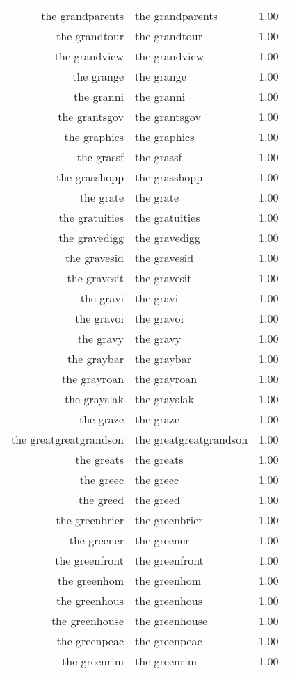\begin{table}[ht]
\begin{tabular}{rlr}
  the grandparents & the grandparents & 1.00 \\ 
  the grandtour & the grandtour & 1.00 \\ 
  the grandview & the grandview & 1.00 \\ 
  the grange & the grange & 1.00 \\ 
  the granni & the granni & 1.00 \\ 
  the grantsgov & the grantsgov & 1.00 \\ 
  the graphics & the graphics & 1.00 \\ 
  the grassf & the grassf & 1.00 \\ 
  the grasshopp & the grasshopp & 1.00 \\ 
  the grate & the grate & 1.00 \\ 
  the gratuities & the gratuities & 1.00 \\ 
  the gravedigg & the gravedigg & 1.00 \\ 
  the gravesid & the gravesid & 1.00 \\ 
  the gravesit & the gravesit & 1.00 \\ 
  the gravi & the gravi & 1.00 \\ 
  the gravoi & the gravoi & 1.00 \\ 
  the gravy & the gravy & 1.00 \\ 
  the graybar & the graybar & 1.00 \\ 
  the grayroan & the grayroan & 1.00 \\ 
  the grayslak & the grayslak & 1.00 \\ 
  the graze & the graze & 1.00 \\ 
  the greatgreatgrandson & the greatgreatgrandson & 1.00 \\ 
  the greats & the greats & 1.00 \\ 
  the greec & the greec & 1.00 \\ 
  the greed & the greed & 1.00 \\ 
  the greenbrier & the greenbrier & 1.00 \\ 
  the greener & the greener & 1.00 \\ 
  the greenfront & the greenfront & 1.00 \\ 
  the greenhom & the greenhom & 1.00 \\ 
  the greenhous & the greenhous & 1.00 \\ 
  the greenhouse & the greenhouse & 1.00 \\ 
  the greenpeac & the greenpeac & 1.00 \\ 
  the greenrim & the greenrim & 1.00 \\ 

\end{tabular}
\end{table}
